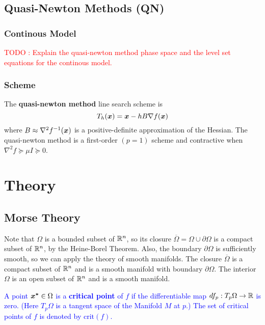 \documentclass[11pt]{article}
\begin{document}
    \medskip


    \subsection{Quasi-Newton Methods (QN)}
    \subsubsection*{Continous Model}
        \textcolor{Red}{
            TODO : Explain the quasi-newton method phase space and the level
            set equations for the continous model.
        }
    \subsubsection*{Scheme}
        The \textbf{quasi-newton method} line search scheme is
        $$
            T_h(\bm{x}) = \bm{x} - h  B \nabla f(\bm{x})
        $$ 
        where $B \approx \nabla^2 f^{-1}(\bm{x})$ is a positive-definite approximation of the Hessian.
        The quasi-newton method is a first-order $(p = 1)$ scheme and contractive when
        $\nabla^2 f \succeq \mu I \succeq 0$.


    \medskip

    \section{Theory}


    \subsection{Morse Theory}
    \medskip

    Note that $\Omega$ is a bounded subset of $\mathbb{R}^n$, so its closure
    $\overline{\Omega} = \Omega \cup \partial \Omega$ is a compact subset
    of $\mathbb{R}^n$, by the Heine-Borel Theorem.
    Also, the boundary $\partial \Omega$ is sufficiently smooth,
    so we can apply the theory of smooth manifolds.
    The closure $\overline{\Omega}$ is a compact subset of $\mathbb{R}^n$ and
    is a smooth manifold with boundary $\partial \Omega$.
    The interior $\Omega$ is an open subset of $\mathbb{R}^n$ and is a smooth manifold.


    \begin{definition}
        \textcolor{blue}{
            A point $\bm{x^*} \in \Omega$ is a \textbf{critical point} of $f$ if the
            differentiable map $df_p: T_p \Omega \rightarrow \mathbb{R}$ is zero. (Here
            $T_p \Omega$ is a tangent space of the Manifold $M$ at $p$.) 
            The set of critical points of $f$ is denoted by $\text{crit}(f)$.
        }
    \end{definition}
\end{document}
